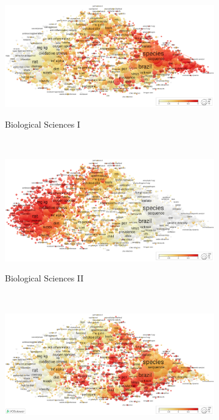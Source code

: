 \begin{figure}[H]
\vspace{8pt}
\captionsetup[sub]{justification=raggedright, singlelinecheck=false}
    \centering
     \begin{subfigure}[t]{1\textwidth}
     \includegraphics[width=1\textwidth]{images/chapter_classific/VOSviewer-CBI.png}\label{fig:classif:vosviewer_cb1}
    \vspace{-20em}\caption{Biological Sciences I}
  \end{subfigure}
  \\
  \begin{subfigure}[t]{1\textwidth}
     \includegraphics[width=1\textwidth]{images/chapter_classific/VOSviewer-CBII.png}\label{fig:classif:vosviewer_cb2}
    \vspace{-20em}\caption{Biological Sciences II}
  \end{subfigure}
  \\
  \begin{subfigure}[t]{1\textwidth}
     \includegraphics[width=1\textwidth]{images/chapter_classific/VOSviewer-CBIII.png}\label{fig:classif:vosviewer_cb3}

\end{subfigure}
\end{figure}
